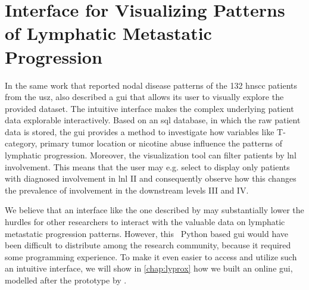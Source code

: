 \documentclass[\relativeRoot/main.tex]{subfiles}
\begin{document}
\section[Interface for Visualizing Patterns of Progression]{Interface for Visualizing Patterns\\of Lymphatic Metastatic Progression}
\label{sec:previous_work:prototype_gui}

In the same work that reported nodal disease patterns of the 132 \gls{hnscc} patients from the \gls{usz},  also described a \gls{gui} that allows its user to visually explore the provided dataset. The intuitive interface makes the complex underlying patient data explorable interactively. Based on an \acrshort{sql} database, in which the raw patient data is stored, the \gls{gui} provides a method to investigate how variables like T-category, primary tumor location or nicotine abuse influence the patterns of lymphatic progression. Moreover, the visualization tool can filter patients by \gls{lnl} involvement. This means that the user may e.g. select to display only patients with diagnosed involvement in \gls{lnl} II and consequently observe how this changes the prevalence of involvement in the downstream levels III and IV.

We believe that an interface like the one described by  may substantially lower the hurdles for other researchers to interact with the valuable data on lymphatic metastatic progression patterns. However, this ~Python based \gls{gui} would have been difficult to distribute among the research community, because it required some programming experience. To make it even easier to access and utilize such an intuitive interface, we will show in \cref{chap:lyprox} how we built an online \gls{gui}, modelled after the prototype by .
\end{document}

